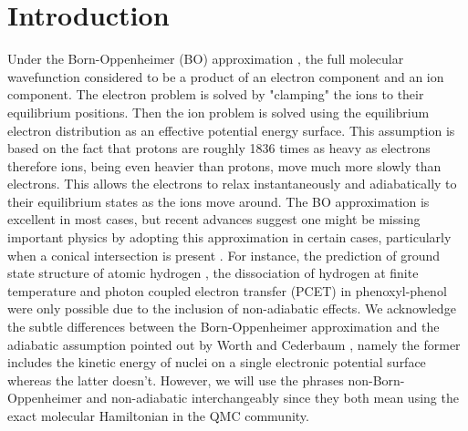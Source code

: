 \documentclass[aps,prl,superscriptaddress,groupedaddress]{revtex4}
\begin{document}


\maketitle

\section{Introduction}
Under the Born-Oppenheimer (BO) approximation \cite{BO}, the full molecular wavefunction considered to be a product of an electron component and an ion component. The electron problem is solved by "clamping" the ions to their equilibrium positions. Then the ion problem is solved using the equilibrium electron distribution as an effective potential energy surface. This assumption is based on the fact that protons are roughly 1836 times as heavy as electrons therefore ions, being even heavier than protons, move much more slowly than electrons. This allows the electrons to relax instantaneously and adiabatically to their equilibrium states as the ions move around. The BO approximation is excellent in most cases, but recent advances suggest one might be missing important physics by adopting this approximation in certain cases, particularly when a conical intersection is present \cite{Cederbaum_BO}. For instance, the prediction of ground state structure of atomic hydrogen \cite{Ceperley_1987,Natoli_1993,Natoli_1995}, the dissociation of hydrogen at finite temperature \cite{Mazzola_FiniteT} and photon coupled electron transfer (PCET) in phenoxyl-phenol \cite{Sirjoosingh_PCET} were only possible due to the inclusion of non-adiabatic effects. We acknowledge the subtle differences between the Born-Oppenheimer approximation and the adiabatic assumption pointed out by Worth and Cederbaum \cite{Cederbaum_BO}, namely the former includes the kinetic energy of nuclei on a single electronic potential surface whereas the latter doesn't. However, we will use the phrases non-Born-Oppenheimer and non-adiabatic interchangeably since they both mean using the exact molecular Hamiltonian in the QMC community.
\end{document}
